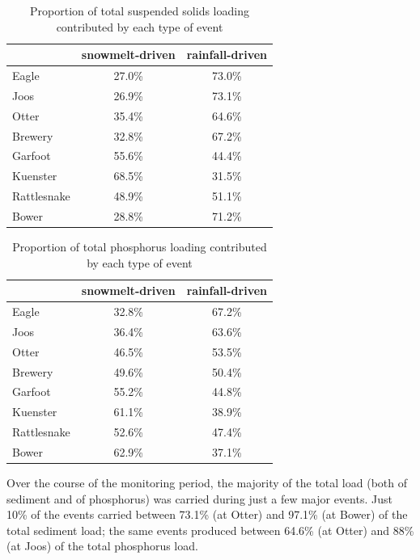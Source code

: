 \documentclass[10pt]{article}
\begin{document}
\begin{table}[ht]
\begin{center}
\begin{tabular}{lcc}
  & snowmelt-driven & rainfall-driven \\ 
  \hline
Eagle & 27.0\% & 73.0\% \\ 
  Joos & 26.9\% & 73.1\% \\ 
  Otter & 35.4\% & 64.6\% \\ 
  Brewery & 32.8\% & 67.2\% \\ 
  Garfoot & 55.6\% & 44.4\% \\ 
  Kuenster & 68.5\% & 31.5\% \\ 
  Rattlesnake & 48.9\% & 51.1\% \\ 
  Bower & 28.8\% & 71.2\% \\ 
  \end{tabular}
\caption{Proportion of total suspended solids loading contributed by each type of event}
\label{tab:stot}
\end{center}
\end{table}
\begin{table}[ht]
\begin{center}
\begin{tabular}{lcc}
  & snowmelt-driven & rainfall-driven \\ 
  \hline
Eagle & 32.8\% & 67.2\% \\ 
  Joos & 36.4\% & 63.6\% \\ 
  Otter & 46.5\% & 53.5\% \\ 
  Brewery & 49.6\% & 50.4\% \\ 
  Garfoot & 55.2\% & 44.8\% \\ 
  Kuenster & 61.1\% & 38.9\% \\ 
  Rattlesnake & 52.6\% & 47.4\% \\ 
  Bower & 62.9\% & 37.1\% \\ 
  \end{tabular}
\caption{Proportion of total phosphorus loading contributed by each type of event}
\label{tab:ptot}
\end{center}
\end{table}
Over the course of the monitoring period, the majority of the total load (both of sediment and of phosphorus) was carried during just a few major events. Just 10\% of the events carried between 73.1\% (at Otter) and 97.1\% (at Bower) of the total sediment load; the same events produced between 64.6\% (at Otter) and 88\% (at Joos) of the total phosphorus load.\\
\end{document}
